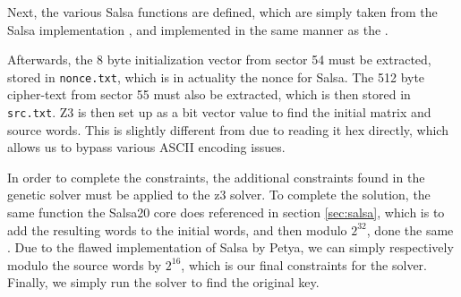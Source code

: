 \documentclass[twocolumn]{article}
\newcommand{\code}[1]{\texttt{#1}}
\begin{document}
Next, the various Salsa functions are defined, which are simply taken from the Salsa implementation \cite{salsa20}, and implemented in the same manner as the \cite{codeTemplate}.

Afterwards, the 8 byte initialization vector from sector 54 must be extracted, stored in \code{nonce.txt}, which is in actuality the nonce for Salsa. The 512 byte cipher-text from sector 55 must also be extracted, which is then stored in \code{src.txt}. Z3 is then set up as a bit vector value to find the initial matrix and source words. This is slightly different from \cite{codeTemplate} due to reading it hex directly, which allows us to bypass various ASCII encoding issues.

In order to complete the constraints, the additional constraints found in the genetic solver must be applied to the z3 solver. To complete the solution, the same function the Salsa20 core does referenced in section \ref{sec:salsa}, which is to add the resulting words to the initial words, and then modulo $2^{32}$, done the same . Due to the flawed implementation of Salsa by Petya, we can simply respectively modulo the source words by $2^{16}$, which is our final constraints for the solver. Finally, we simply run the solver to find the original key. 

 
\end{document}
